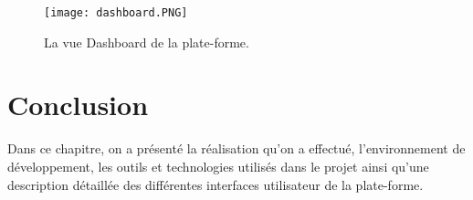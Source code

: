 \begin{figure}[ht]
  \centering
  \texttt{[image: dashboard.PNG]}
  \caption{La vue Dashboard de la plate-forme.}
  \label{fig:dashboard}
\end{figure}
\FloatBarrier

 


\section{Conclusion}
Dans ce chapitre, on a présenté la réalisation qu'on a effectué, l’environnement de développement, les outils et technologies utilisés dans le projet ainsi qu'une description détaillée des différentes interfaces utilisateur de la plate-forme.


